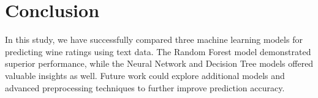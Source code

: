 \documentclass[twocolumn]{article}
\begin{document}
\section{Conclusion}
In this study, we have successfully compared three machine learning models for predicting wine ratings using text data. The Random Forest model demonstrated superior performance, while the Neural Network and Decision Tree models offered valuable insights as well. Future work could explore additional models and advanced preprocessing techniques to further improve prediction accuracy.
\end{document}
